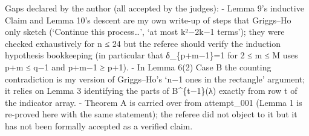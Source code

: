 Gaps declared by the author (all accepted by the judges): - Lemma 9's
inductive Claim and Lemma 10's descent are my own write-up of steps that
Griggs--Ho only sketch (`Continue this process\ldots{}', `at most
k²−2k−1 terms'); they were checked exhaustively for n ≤ 24 but the
referee should verify the induction hypothesis bookkeeping (in
particular that δ\_\{p+m−1\}=1 for 2 ≤ m ≤ M uses p+m ≤ q−1 and p+m−1 ≥
p+1). - In Lemma 6(2) Case B the counting contradiction is my version of
Griggs--Ho's `n−1 ones in the rectangle' argument; it relies on Lemma 3
identifying the parts of B\^{}\{t−1\}(λ) exactly from row t of the
indicator array. - Theorem A is carried over from attempt\_001 (Lemma 1
is re-proved here with the same statement); the referee did not object
to it but it has not been formally accepted as a verified claim.

